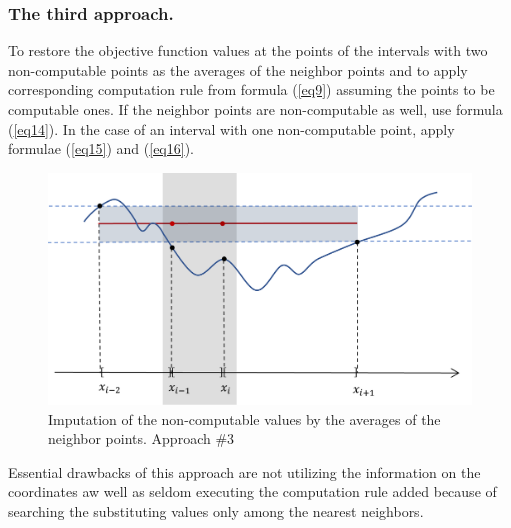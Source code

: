 \documentclass[runningheads]{llncs}
\begin{document}
\subsubsection{The third approach.} To restore the objective function values at the points of the intervals with two non-computable points as the averages of the neighbor points and to apply corresponding computation rule from formula (\ref{eq9}) assuming the points to be computable ones. If the neighbor points are non-computable as well, use formula (\ref{eq14}). In the case of an interval with one non-computable point, apply formulae (\ref{eq15}) and (\ref{eq16}).
\begin{figure}
\includegraphics[width=\textwidth]{fig3.png}
\caption{Imputation of the non-computable values by the averages of the neighbor points. Approach \#3} \label{fig3}
\end{figure}

Essential drawbacks of this approach are not utilizing the information on the coordinates aw well as seldom executing the computation rule added because of searching the substituting values only among the nearest neighbors.
\end{document}
